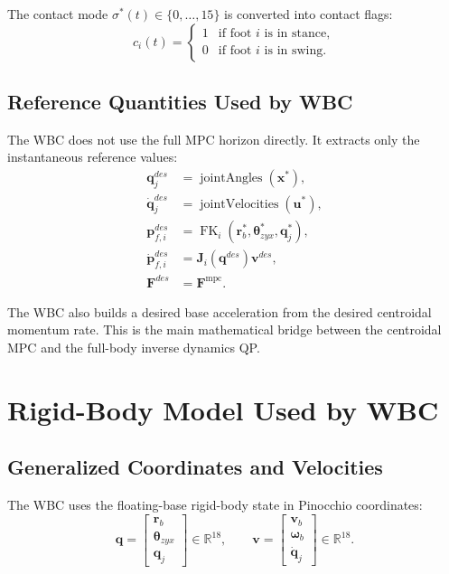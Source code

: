 \documentclass[11pt,a4paper]{article}
\newcommand{\R}{\mathbb{R}}
\begin{document}
The contact mode $\sigma^*(t)\in\{0,\ldots,15\}$ is converted into contact flags:
\begin{equation}
	c_i(t)
	=
	\begin{cases}
		1 & \text{if foot } i \text{ is in stance},\\
		0 & \text{if foot } i \text{ is in swing}.
	\end{cases}
\end{equation}

\subsection{Reference Quantities Used by WBC}

The WBC does not use the full MPC horizon directly. It extracts only the instantaneous reference values:
\begin{align}
	\bm{q}_j^{des}      &= \operatorname{jointAngles}(\bm{x}^*),\\
	\dot{\bm{q}}_j^{des}&= \operatorname{jointVelocities}(\bm{u}^*),\\
	\bm{p}_{f,i}^{des}  &= \operatorname{FK}_i(\bm{r}_b^*,\bm{\theta}_{zyx}^*,\bm{q}_j^*),\\
	\dot{\bm{p}}_{f,i}^{des}
	&= \bm{J}_i(\bm{q}^{des})\bm{v}^{des},\\
	\bm{F}^{des}        &= \bm{F}^{\text{mpc}}.
\end{align}

The WBC also builds a desired base acceleration from the desired centroidal momentum rate. This is the main mathematical bridge between the centroidal MPC and the full-body inverse dynamics QP.


\section{Rigid-Body Model Used by WBC}

\subsection{Generalized Coordinates and Velocities}

The WBC uses the floating-base rigid-body state in Pinocchio coordinates:
\begin{equation}
	\bm{q}
	=
	\begin{bmatrix}
		\bm{r}_b\\
		\bm{\theta}_{zyx}\\
		\bm{q}_j
	\end{bmatrix}
	\in \R^{18},
	\qquad
	\bm{v}
	=
	\begin{bmatrix}
		\bm{v}_b\\
		\bm{\omega}_b\\
		\dot{\bm{q}}_j
	\end{bmatrix}
	\in \R^{18}.
\end{equation}
\end{document}
